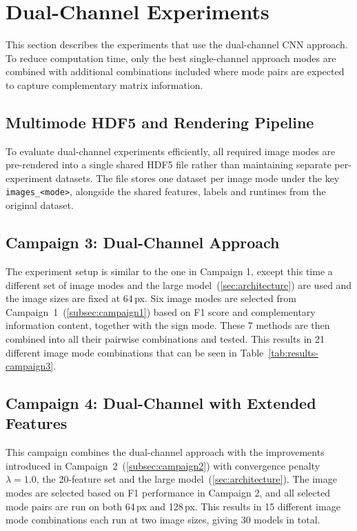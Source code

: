 \section{Dual-Channel Experiments}\label{sec:dual-channel-exp}

This section describes the experiments that use the dual-channel CNN approach.
To reduce computation time, only the best single-channel approach modes are combined with additional combinations included where
mode pairs are expected to capture complementary matrix information.

\subsection{Multimode HDF5 and Rendering Pipeline}\label{subsec:multimode-hdf5}

To evaluate dual-channel experiments efficiently, all required image modes are pre-rendered into a single shared HDF5 file
rather than maintaining separate per-experiment datasets.
The file stores one dataset per image mode under the key \texttt{images\_<mode>}, alongside the shared features, labels and runtimes from the original dataset.

\subsection{Campaign 3: Dual-Channel Approach}\label{subsec:campaign3}

The experiment setup is similar to the one in Campaign 1, except this time a different set of image modes and the large model~(\autoref{sec:architecture}) are used and
the image sizes are fixed at 64\,px.
Six image modes are selected from Campaign~1~(\autoref{subsec:campaign1}) based on F1 score and complementary information content, together with the sign mode.
These 7 methods are then combined into all their pairwise combinations and tested.
This results in 21 different image mode combinations that can be seen in Table~\ref{tab:results-campaign3}.

\subsection{Campaign 4: Dual-Channel with Extended Features}\label{subsec:campaign4}

This campaign combines the dual-channel approach with the improvements introduced in Campaign~2~(\autoref{subsec:campaign2}) with convergence penalty $\lambda = 1.0$, the 20-feature set and the large model~(\autoref{sec:architecture}).
The image modes are selected based on F1 performance in Campaign 2, and all selected mode pairs are run on both 64\,px and 128\,px.
This results in 15 different image mode combinations each run at two image sizes, giving 30 models in total.

